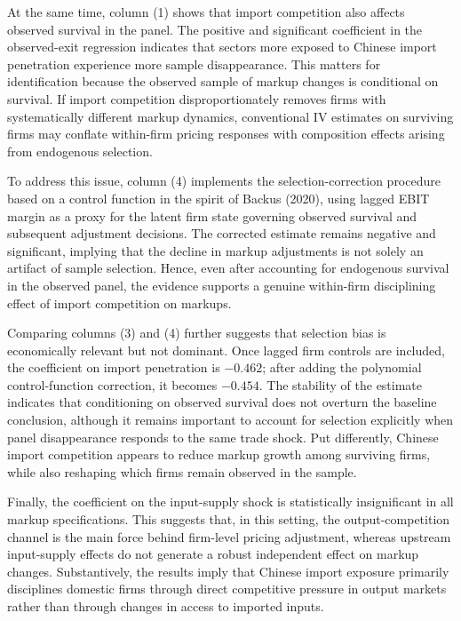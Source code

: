\documentclass[12pt]{article}
\begin{document}
At the same time, column (1) shows that import competition also affects observed survival in the panel. The positive and significant coefficient in the observed-exit regression indicates that sectors more exposed to Chinese import penetration experience more sample disappearance. This matters for identification because the observed sample of markup changes is conditional on survival. If import competition disproportionately removes firms with systematically different markup dynamics, conventional IV estimates on surviving firms may conflate within-firm pricing responses with composition effects arising from endogenous selection.

To address this issue, column (4) implements the selection-correction procedure based on a control function in the spirit of Backus (2020), using lagged EBIT margin as a proxy for the latent firm state governing observed survival and subsequent adjustment decisions. The corrected estimate remains negative and significant, implying that the decline in markup adjustments is not solely an artifact of sample selection. Hence, even after accounting for endogenous survival in the observed panel, the evidence supports a genuine within-firm disciplining effect of import competition on markups.

Comparing columns (3) and (4) further suggests that selection bias is economically relevant but not dominant. Once lagged firm controls are included, the coefficient on import penetration is $-0.462$; after adding the polynomial control-function correction, it becomes $-0.454$. The stability of the estimate indicates that conditioning on observed survival does not overturn the baseline conclusion, although it remains important to account for selection explicitly when panel disappearance responds to the same trade shock. Put differently, Chinese import competition appears to reduce markup growth among surviving firms, while also reshaping which firms remain observed in the sample.

Finally, the coefficient on the input-supply shock is statistically insignificant in all markup specifications. This suggests that, in this setting, the output-competition channel is the main force behind firm-level pricing adjustment, whereas upstream input-supply effects do not generate a robust independent effect on markup changes. Substantively, the results imply that Chinese import exposure primarily disciplines domestic firms through direct competitive pressure in output markets rather than through changes in access to imported inputs.
\end{document}
